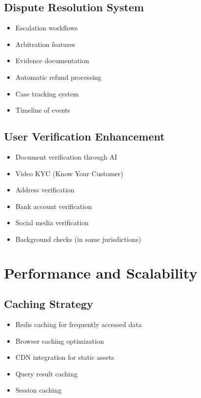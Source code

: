 \subsection{Dispute Resolution System}

\begin{itemize}
    \item Escalation workflows
    \item Arbitration features
    \item Evidence documentation
    \item Automatic refund processing
    \item Case tracking system
    \item Timeline of events
\end{itemize}

\subsection{User Verification Enhancement}

\begin{itemize}
    \item Document verification through AI
    \item Video KYC (Know Your Customer)
    \item Address verification
    \item Bank account verification
    \item Social media verification
    \item Background checks (in some jurisdictions)
\end{itemize}

\section{Performance and Scalability}

\subsection{Caching Strategy}

\begin{itemize}
    \item Redis caching for frequently accessed data
    \item Browser caching optimization
    \item CDN integration for static assets
    \item Query result caching
    \item Session caching
\end{itemize}

